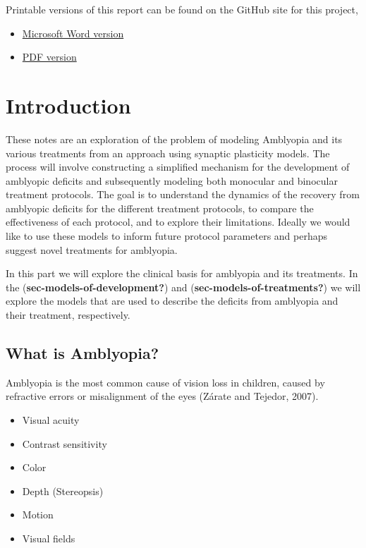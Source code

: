 \documentclass[
  onecolumn]{article}
\providecommand{\tightlist}{%
  \setlength{\itemsep}{0pt}\setlength{\parskip}{0pt}}
\begin{document}
Printable versions of this report can be found on the GitHub site for
this project,

\begin{itemize}
\tightlist
\item
  \href{https://github.com/bblais/Amblyopia-Simulation/raw/main/Manuscript/docs/Comparing-Treatments-for-Amblyopia-with-a-Synaptic-Plasticity-Model.docx}{Microsoft
  Word version}
\item
  \href{https://github.com/bblais/Amblyopia-Simulation/raw/main/Manuscript/docs/Comparing-Treatments-for-Amblyopia-with-a-Synaptic-Plasticity-Model.pdf}{PDF
  version}
\end{itemize}

\hypertarget{introduction}{%
\section{Introduction}\label{introduction}}

These notes are an exploration of the problem of modeling Amblyopia and
its various treatments from an approach using synaptic plasticity
models. The process will involve constructing a simplified mechanism for
the development of amblyopic deficits and subsequently modeling both
monocular and binocular treatment protocols. The goal is to understand
the dynamics of the recovery from amblyopic deficits for the different
treatment protocols, to compare the effectiveness of each protocol, and
to explore their limitations. Ideally we would like to use these models
to inform future protocol parameters and perhaps suggest novel
treatments for amblyopia.

In this part we will explore the clinical basis for amblyopia and its
treatments. In the (\textbf{sec-models-of-development?}) and
(\textbf{sec-models-of-treatments?}) we will explore the models that are
used to describe the deficits from amblyopia and their treatment,
respectively.

\hypertarget{what-is-amblyopia}{%
\subsection{What is Amblyopia?}\label{what-is-amblyopia}}

Amblyopia is the most common cause of vision loss in children, caused by
refractive errors or misalignment of the eyes (Zárate and Tejedor,
2007).

\begin{itemize}
\tightlist
\item
  Visual acuity
\item
  Contrast sensitivity
\item
  Color
\item
  Depth (Stereopsis)
\item
  Motion
\item
  Visual fields
\end{itemize}
\end{document}
